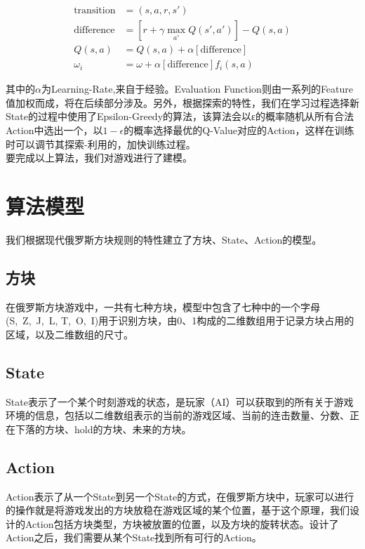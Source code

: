 \documentclass[10pt,UTF8]{article}
\begin{document}
\begin{multicols}{2}
\begin{equation*}
    \begin{aligned}
        \mbox{transition} &= (s,a,r,s')\\
        \mbox{difference} &= [r + \gamma \mathop{max}\limits_{a'}Q(s',a')] - Q(s,a)\\
        Q(s,a) &= Q(s,a) + \alpha[\mbox{difference}]\\
        \omega_i &= \omega + \alpha[\mbox{difference}] f_i(s,a)
    \end{aligned}
\end{equation*}

其中的$\alpha$为Learning-Rate,来自于经验。Evaluation Function则由一系列的Feature值加权而成，将在后续部分涉及。另外，根据探索的特性，我们在学习过程选择新State的过程中使用了Epsilon-Greedy的算法，该算法会以ε的概率随机从所有合法Action中选出一个，以$1-\epsilon$的概率选择最优的Q-Value对应的Action，这样在训练时可以调节其探索-利用的，加快训练过程。\\
要完成以上算法，我们对游戏进行了建模。

\section{算法模型}

我们根据现代俄罗斯方块规则的特性建立了方块、State、Action的模型。

\subsection{方块}

在俄罗斯方块游戏中，一共有七种方块，模型中包含了七种中的一个字母(S, Z, J, L, T, O, I)用于识别方块，由0、1构成的二维数组用于记录方块占用的区域，以及二维数组的尺寸。

\subsection{State}

State表示了一个某个时刻游戏的状态，是玩家（AI）可以获取到的所有关于游戏环境的信息，包括以二维数组表示的当前的游戏区域、当前的连击数量、分数、正在下落的方块、hold的方块、未来的方块。

\subsection{Action}

Action表示了从一个State到另一个State的方式，在俄罗斯方块中，玩家可以进行的操作就是将游戏发出的方块放稳在游戏区域的某个位置，基于这个原理，我们设计的Action包括方块类型，方块被放置的位置，以及方块的旋转状态。设计了Action之后，我们需要从某个State找到所有可行的Action。\\


\end{multicols}
\end{document}
